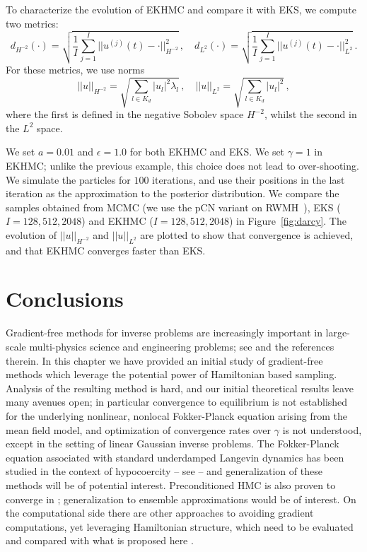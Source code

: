 \documentclass[12pt]{caltech_thesis}
\numberwithin{equation}{section}
\begin{document}
{To characterize the evolution of EKHMC and compare it with EKS, we compute two metrics:
\begin{equation}
    d_{H^{-2}}(\cdot)=\sqrt{\frac{1}{I}\sum_{j=1}^I  ||u^{(j)}(t)-\cdot||_{H^{-2}}^2}\,,\quad d_{L^2}(\cdot)=\sqrt{\frac{1}{I}\sum_{j=1}^I  ||u^{(j)}(t)-\cdot||^{2}_{L^2}}\,.
\end{equation}
For these metrics, we use norms 
\begin{equation}
    ||u||_{H^{-2}}=\sqrt{\sum_{l\in K_d}|u_l|^2\lambda_l}\,, \quad ||u||_{L^2}=\sqrt{\sum_{l\in K_d} |u_l|^2}\,,
\end{equation}
where the first is defined in the negative Sobolev space $H^{-2}$, whilst the second in the $L^2$ space.

We set $a=0.01$ and $\epsilon=1.0$ for both EKHMC and EKS. We set $\gamma=1$ in EKHMC; {unlike the previous example, this choice does not lead to over-shooting.}
We simulate the particles for $100$ iterations, and use their positions in the last iteration as the approximation to the posterior distribution. We compare the samples obtained from MCMC (we use the pCN variant on RWMH~\cite{cotter2013mcmc}), EKS ($I=128,512,2048$) and EKHMC ($I=128,512,2048$) in Figure~\ref{fig:darcy}. The evolution of $||u||_{H^{-2}}$ and $||u||_{L^2}$ are plotted to show that convergence is achieved, and that EKHMC converges faster than EKS.

\section{Conclusions}\label{5}

{Gradient-free methods for inverse problems are increasingly important in large-scale
multi-physics science and engineering problems; see \cite{huang2022efficient} and
the references therein. In this chapter
we have provided an initial study of gradient-free methods which leverage the potential
power of Hamiltonian based sampling. Analysis of the resulting method is hard, and
our initial theoretical results leave many avenues open; in particular convergence to
equilibrium {is not established for the underlying nonlinear, nonlocal
Fokker-Planck equation arising from the mean field model,
and optimization of convergence rates over $\gamma$ is not understood,
except in the setting of linear
Gaussian inverse problems.}
The Fokker-Planck equation associated with standard underdamped Langevin dynamics has 
been studied in the context of hypocoercity -- see \cite{bakry1985diffusions,villani2006hypocoercivity} -- and generalization of these methods will be of potential interest. Preconditioned HMC is also proven to converge in \cite{bou2021two}; generalization to ensemble approximations would be of interest. On the computational side there are other approaches to avoiding gradient computations, yet leveraging Hamiltonian structure, which need to be evaluated and compared with what is proposed here \cite{lan2016emulation}.}

}
\end{document}

